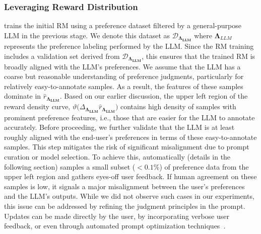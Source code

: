 \subsubsection{\myname{} Leveraging Reward Distribution}
\label{sec:leveraging_reward_score}
\myname{} trains the initial RM using a preference dataset filtered by a general-purpose LLM in the previous stage. We denote this dataset as $\mathcal{D}_{\mathbf{\Lambda_{LLM}}}$ where $\mathbf{\Lambda}_{LLM}$ represents the preference labeling performed by the LLM. Since the RM training includes a validation set derived from $\mathcal{D}_{\mathbf{\Lambda_{LLM}}}$, this ensures that the trained RM is broadly aligned with the LLM’s preferences. We assume that the LLM has a coarse but reasonable understanding of preference judgments, particularly for relatively easy-to-annotate samples. As a result, the features of these samples dominate in $\hat{r}_\mathbf{\Lambda_{LLM}}$. Based on our earlier discussion, the upper left region of the reward density curve, $\vartheta(\Delta_{\mathbf{\Lambda_{LLM}}}{\hat{r}_\mathbf{\Lambda_{LLM}})}$ contains high density of samples with prominent preference features, i.e., those that are easier for the LLM to annotate accurately. Before proceeding, we further validate that the LLM is at least roughly aligned with the end-user’s preferences in terms of these easy-to-annotate samples. This step mitigates the risk of significant misalignment due to prompt curation or model selection. To achieve this, \myname{} automatically (details in the following section) samples a small subset ($<0.1\%$) of preference data from the upper left region and gathers eyes-off user feedback. If human agreement on these samples is low, it signals a major misalignment between the user’s preferences and the LLM’s outputs. While we did not observe such cases in our experiments, this issue can be addressed by refining the judgment principles in the prompt. Updates can be made directly by the user, by incorporating verbose user feedback, or even through automated prompt optimization techniques~\cite{kepel2024autonomous, li2024learning}.

